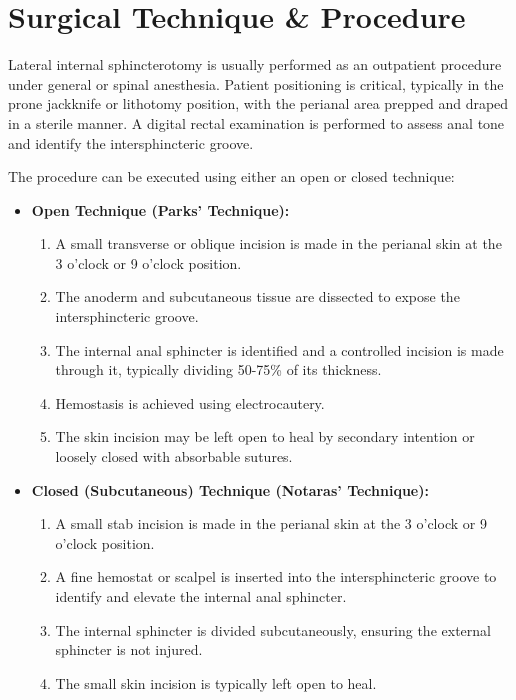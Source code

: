 \section*{Surgical Technique \& Procedure}
Lateral internal sphincterotomy is usually performed as an outpatient procedure under general or spinal anesthesia. Patient positioning is critical, typically in the prone jackknife or lithotomy position, with the perianal area prepped and draped in a sterile manner. A digital rectal examination is performed to assess anal tone and identify the intersphincteric groove.

The procedure can be executed using either an open or closed technique:

\begin{itemize}
  \item \textbf{Open Technique (Parks' Technique):}
    \begin{enumerate}
      \item A small transverse or oblique incision is made in the perianal skin at the 3 o'clock or 9 o'clock position.
      \item The anoderm and subcutaneous tissue are dissected to expose the intersphincteric groove.
      \item The internal anal sphincter is identified and a controlled incision is made through it, typically dividing 50-75\% of its thickness.
      \item Hemostasis is achieved using electrocautery.
      \item The skin incision may be left open to heal by secondary intention or loosely closed with absorbable sutures.
    \end{enumerate}

  \item \textbf{Closed (Subcutaneous) Technique (Notaras' Technique):}
    \begin{enumerate}
      \item A small stab incision is made in the perianal skin at the 3 o'clock or 9 o'clock position.
      \item A fine hemostat or scalpel is inserted into the intersphincteric groove to identify and elevate the internal anal sphincter.
      \item The internal sphincter is divided subcutaneously, ensuring the external sphincter is not injured.
      \item The small skin incision is typically left open to heal.
    \end{enumerate}
\end{itemize}

